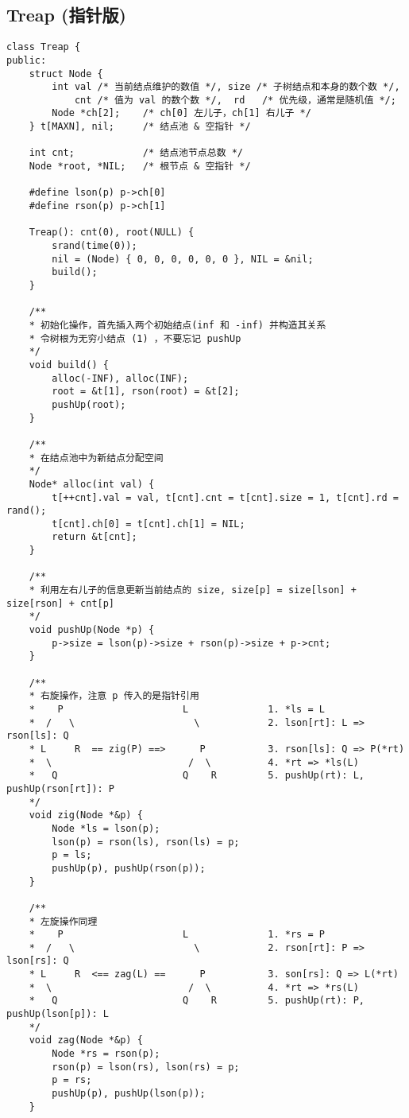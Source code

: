 \subsection{Treap (指针版)}
\begin{verbatim}
class Treap {
public: 
    struct Node {
        int val /* 当前结点维护的数值 */, size /* 子树结点和本身的数个数 */,
            cnt /* 值为 val 的数个数 */,  rd   /* 优先级，通常是随机值 */;
        Node *ch[2];    /* ch[0] 左儿子，ch[1] 右儿子 */
    } t[MAXN], nil;     /* 结点池 & 空指针 */
    
    int cnt;            /* 结点池节点总数 */
    Node *root, *NIL;   /* 根节点 & 空指针 */
    
    #define lson(p) p->ch[0]
    #define rson(p) p->ch[1]
    
    Treap(): cnt(0), root(NULL) {
        srand(time(0));
        nil = (Node) { 0, 0, 0, 0, 0, 0 }, NIL = &nil;
        build();
    }
    
    /**
    * 初始化操作，首先插入两个初始结点(inf 和 -inf) 并构造其关系 
    * 令树根为无穷小结点 (1) ，不要忘记 pushUp 
    */
    void build() {
        alloc(-INF), alloc(INF);
        root = &t[1], rson(root) = &t[2];
        pushUp(root);
    }
    
    /**
    * 在结点池中为新结点分配空间 
    */
    Node* alloc(int val) {
        t[++cnt].val = val, t[cnt].cnt = t[cnt].size = 1, t[cnt].rd = rand();
        t[cnt].ch[0] = t[cnt].ch[1] = NIL;
        return &t[cnt];
    }
    
    /**
    * 利用左右儿子的信息更新当前结点的 size, size[p] = size[lson] + size[rson] + cnt[p]
    */
    void pushUp(Node *p) {
        p->size = lson(p)->size + rson(p)->size + p->cnt;
    }
    
    /**
    * 右旋操作，注意 p 传入的是指针引用 
    *    P                     L              1. *ls = L
    *  /   \                     \            2. lson[rt]: L => rson[ls]: Q
    * L     R  == zig(P) ==>      P           3. rson[ls]: Q => P(*rt)
    *  \                        /  \          4. *rt => *ls(L)
    *   Q                      Q    R         5. pushUp(rt): L, pushUp(rson[rt]): P
    */
    void zig(Node *&p) {
        Node *ls = lson(p);
        lson(p) = rson(ls), rson(ls) = p;
        p = ls;
        pushUp(p), pushUp(rson(p));
    }
    
    /**
    * 左旋操作同理 
    *    P                     L              1. *rs = P
    *  /   \                     \            2. rson[rt]: P => lson[rs]: Q
    * L     R  <== zag(L) ==      P           3. son[rs]: Q => L(*rt)
    *  \                        /  \          4. *rt => *rs(L)
    *   Q                      Q    R         5. pushUp(rt): P, pushUp(lson[p]): L
    */
    void zag(Node *&p) {
        Node *rs = rson(p);
        rson(p) = lson(rs), lson(rs) = p;
        p = rs;
        pushUp(p), pushUp(lson(p));
    }
    

\end{verbatim}
